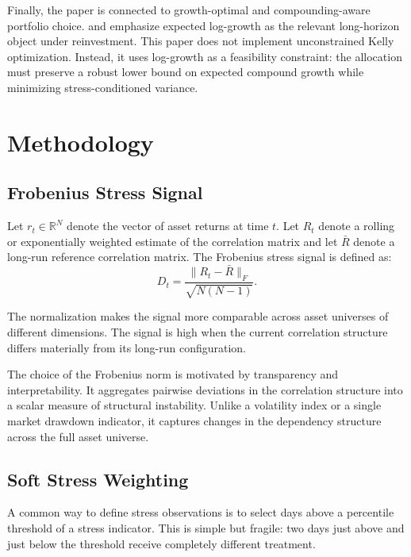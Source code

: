 \documentclass[11pt]{article}
\begin{document}
Finally, the paper is connected to growth-optimal and compounding-aware portfolio choice. \citet{kelly1956} and \citet{latane1959} emphasize expected log-growth as the relevant long-horizon object under reinvestment. This paper does not implement unconstrained Kelly optimization. Instead, it uses log-growth as a feasibility constraint: the allocation must preserve a robust lower bound on expected compound growth while minimizing stress-conditioned variance.

\section{Methodology}
\label{sec:methodology}

\subsection{Frobenius Stress Signal}

Let $r_t \in \mathbb{R}^N$ denote the vector of asset returns at time $t$. Let $R_t$ denote a rolling or exponentially weighted estimate of the correlation matrix and let $\bar{R}$ denote a long-run reference correlation matrix. The Frobenius stress signal is defined as:
\begin{equation}
D_t = \frac{\|R_t - \bar{R}\|_F}{\sqrt{N(N-1)}}.
\end{equation}

The normalization makes the signal more comparable across asset universes of different dimensions. The signal is high when the current correlation structure differs materially from its long-run configuration.

The choice of the Frobenius norm is motivated by transparency and interpretability. It aggregates pairwise deviations in the correlation structure into a scalar measure of structural instability. Unlike a volatility index or a single market drawdown indicator, it captures changes in the dependency structure across the full asset universe.

\subsection{Soft Stress Weighting}

A common way to define stress observations is to select days above a percentile threshold of a stress indicator. This is simple but fragile: two days just above and just below the threshold receive completely different treatment.
\end{document}
